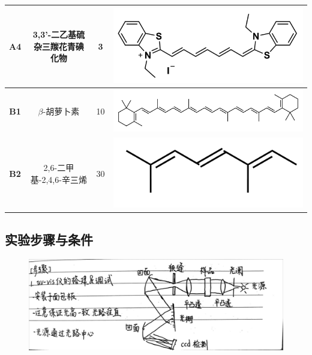 \begin{table}[H]
\begin{adjustwidth}{-2cm}{-2cm}
\begin{center}
\begin{tabular}{cccM{9cm}}
    \textbf{A4} & 3,3'-二乙基硫杂三羰花青碘化物 & 3 & \includegraphics[scale=.2]{figures/0-A-4.png} \\
    \midrule
    \textbf{B1} & $\beta$-胡萝卜素 & 10 & \includegraphics[scale=.2]{figures/0-B-1.png} \\
    \textbf{B2} & 2,6-二甲基-2,4,6-辛三烯 & 30 & \includegraphics[scale=.2]{figures/0-B-2.png} \\
    \bottomrule
    \end{tabular}
    \end{center}
    \end{adjustwidth}
    \label{tab:0}
\end{table}

\subsection{实验步骤与条件}

\begin{figure}[H]
    \centering
    \includegraphics[width=.7\textwidth]{figures/0-3-1.jpg}
\end{figure}


